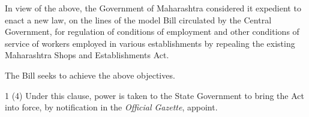 \documentclass[gaz8]{mhact}
\begin{document}
\begin{sor}
\item In view of the above, the Government of Maharashtra considered
  it expedient to enact a new law, on the lines of the model Bill
  circulated by the Central Government, for regulation of conditions
  of employment and other conditions of service of workers employed in
  various establishments by repealing the existing Maharashtra Shops
  and Establishments Act.

\item The Bill seeks to achieve the above objectives.

\end{sor}


\begin{mrdl}
  \begin{dllist}
  \item 1 (4) Under this clause, power is taken to the State Government
    to bring the Act into force, by notification in the \emph{Official
      Gazette}, appoint.


\end{dllist}
\end{mrdl}
\end{document}

